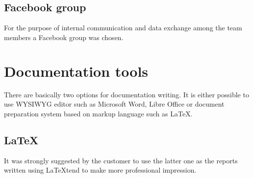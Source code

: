 \subsection{Facebook group}
For the purpose of internal communication and data exchange among the team members a Facebook group was chosen.


\section{Documentation tools} \label{txt:documentation tools}

There are basically two options for documentation writing. It is either possible to use WYSIWYG editor such as Microsoft Word, Libre Office or document preparation system based on markup language such as \LaTeX.

\subsection{LaTeX}

It was strongly suggested by the customer to use the latter one as the reports written using \LaTeX  tend to make more professional impression.


